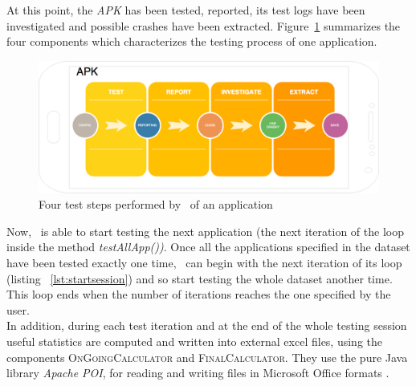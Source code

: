 At this point, the \textit{APK} has been tested, reported, its test logs have been investigated and possible crashes have been extracted. Figure~\ref{fig: apkprocess} summarizes the four components which characterizes the testing process of one application. 
\begin{figure}[tb]
\centering 
\includegraphics[width=\columnwidth]{imgs/apkprocess} 
\caption{Four test steps performed by \toolname\ of an application}
\label{fig: apkprocess}
\end{figure}



Now, \toolname\ is able to start testing the next application (\ie the next iteration of the loop inside the method \textit{testAllApp())}. 
Once all the applications specified in the dataset have been tested exactly one time, \SessionLauncher\ can begin with the next iteration of its loop (listing ~\ref{lst:startsession}) and so start testing the whole dataset another time. 
This loop ends when the number of iterations reaches the one specified by the user. \\
In addition, during each test iteration and at the end of the whole testing session useful statistics are computed and written into external excel files, using the components \textsc{OnGoingCalculator} and \textsc{FinalCalculator}. They use the pure Java library \textit{Apache POI}, for reading and writing files in Microsoft Office formats \cite{apachepoi}. 




